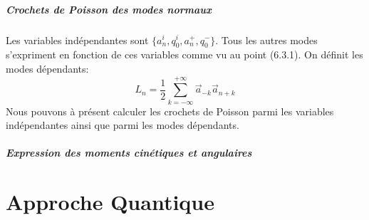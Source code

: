 \documentclass[a4paper,12pt]{article}
\begin{document}
\subsubsection{Crochets de Poisson des modes normaux}
Les variables indépendantes sont $\{a_n^i,q_0^i,a_n^+,q_0^-\}$. Tous les autres modes s'expriment en fonction de ces variables comme vu au point (6.3.1). On définit les modes dépendants:
\begin{equation}
L_n=\frac{1}{2}\sum_{k=-\infty}^{+\infty}\vec{a}_{-k}\vec{a}_{n+k}
\end{equation}
Nous pouvons à présent calculer les crochets de Poisson parmi les variables indépendantes ainsi que parmi les modes dépendants.
\subsubsection{Expression des moments cinétiques et angulaires}
\part*{Approche Quantique}
\end{document}
